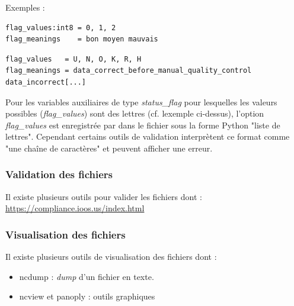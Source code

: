 Exemples :

\begin{verbatim}
flag_values:int8 = 0, 1, 2
flag_meanings    = bon moyen mauvais
\end{verbatim}

\begin{verbatim}
flag_values   = U, N, O, K, R, H
flag_meanings = data_correct_before_manual_quality_control data_incorrect[...]
\end{verbatim}

\begin{warning}

  Pour les variables auxiliaires de type \textit{status\_flag} pour
  lesquelles les valeurs possibles (\textit{flag\_values}) sont des lettres
  (cf. lexemple ci-dessus), l'option \textit{flag\_values} est enregistrée
  par \prodcdf dans le fichier \netcdf sous la forme Python "liste de lettres".
  Cependant certains outils de validation interprètent ce format comme
  "une chaîne de caractères" et peuvent afficher une erreur.
\end{warning}

\subsubsection{Validation des fichiers \netcdf}

Il existe plusieurs outils pour valider les fichiers
\netcdf dont : \url{https://compliance.ioos.us/index.html}

\subsubsection{Visualisation des fichiers \netcdf}

Il existe plusieurs outils de visualisation des fichiers
\netcdf dont :

\begin{itemize}
\item
  ncdump : \textit{dump} d'un fichier \netcdf en texte.
\item
  ncview et panoply : outils graphiques
\end{itemize}

